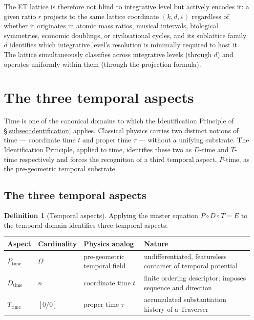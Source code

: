 \documentclass[11pt,a4paper]{article}
\theoremstyle{definition}
\newtheorem{definition}[theorem]{Definition}
\theoremstyle{remark}
\newcommand{\PDT}{\ensuremath{P{\circ}D{\circ}T}}
\begin{document}
The ET lattice is therefore not blind to integrative level but actively encodes it: a given ratio $r$ projects to the same lattice coordinate $(k,d,\varepsilon)$ regardless of whether it originates in atomic mass ratios, musical intervals, biological symmetries, economic doublings, or civilisational cycles, and its sublattice family $d$ identifies which integrative level's resolution is minimally required to host it. The lattice simultaneously classifies across integrative levels (through $d$) and operates uniformly within them (through the projection formula).

\section{The three temporal aspects}\label{sec:temporal}

Time is one of the canonical domains to which the Identification Principle of \S\ref{subsec:identification} applies. Classical physics carries two distinct notions of time --- coordinate time $t$ and proper time $\tau$ --- without a unifying substrate. The Identification Principle, applied to time, identifies these two as $D$-time and $T$-time respectively and forces the recognition of a third temporal aspect, $P$-time, as the pre-geometric temporal substrate.

\subsection{The three temporal aspects}

\begin{definition}[Temporal aspects]\label{def:temporal-aspects}
Applying the master equation $\PDT = E$ to the temporal domain identifies three temporal aspects:

\begin{center}
\begin{tabularx}{\textwidth}{@{}llXX@{}}
\toprule
\textbf{Aspect} & \textbf{Cardinality} & \textbf{Physics analog} & \textbf{Nature}\\
\midrule
$P_{\text{time}}$ & $\Omega$ & pre-geometric temporal field
  & undifferentiated, featureless container of temporal potential\\
$D_{\text{time}}$ & $n$ & coordinate time $t$
  & finite ordering descriptor; imposes sequence and direction\\
$T_{\text{time}}$ & $[0/0]$ & proper time $\tau$
  & accumulated substantiation history of a Traverser\\
\bottomrule
\end{tabularx}
\end{center}
\end{definition}
\end{document}
